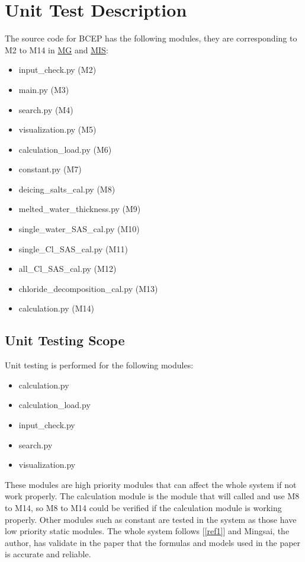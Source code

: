 \documentclass[12pt, titlepage]{article}
\newcommand{\reref}[1]{\ref{#1}}
\begin{document}

\section{Unit Test Description}\label{UTD}
The source code for BCEP has the following modules, they are corresponding to M2 to M14 in \href{https://smiths.github.io/BridgeChlorideExposurePredictor/Design/SoftArchitecture/MG.pdf}{MG} and \href{https://smiths.github.io/BridgeChlorideExposurePredictor/Design/SoftDetailedDes/MIS.pdf}{MIS}:
\begin{itemize}
\item input\_check.py (M2)
\item main.py (M3)
\item search.py (M4)
\item visualization.py (M5)
\item calculation\_load.py (M6)
\item constant.py (M7)
\item deicing\_salts\_cal.py (M8)
\item melted\_water\_thickness.py (M9)
\item single\_water\_SAS\_cal.py (M10)
\item single\_Cl\_SAS\_cal.py (M11)
\item all\_Cl\_SAS\_cal.py (M12)
\item chloride\_decomposition\_cal.py (M13)
\item calculation.py (M14)
\end{itemize}

\subsection{Unit Testing Scope}
Unit testing is performed for the following modules:
\begin{itemize}
\item calculation.py
\item calculation\_load.py
\item input\_check.py
\item search.py
\item visualization.py
\end{itemize}

These modules are high priority modules that can affect the whole system if not work properly. The calculation module is the module that will called and use M8 to M14, so M8 to M14 could be verified if the calculation module is working properly. Other modules such as constant are tested in the system as those
have low priority static modules.
The whole system follows [\reref{ref1}] and Mingsai, the author, has validate in the paper that the formulas and models used in the paper is accurate and reliable. 
\end{document}
